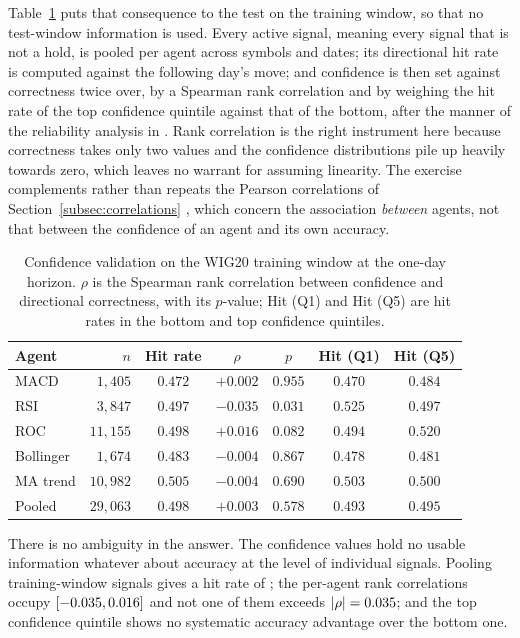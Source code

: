 Table~\ref{tab:confvalid} puts that consequence to the test on the training window, so that no test-window information is used. Every active signal, meaning every signal that is not a hold, is pooled per agent across symbols and dates; its directional hit rate is computed against the following day's move; and confidence is then set against correctness twice over, by a Spearman rank correlation \cite{spearman1904} and by weighing the hit rate of the top confidence quintile against that of the bottom, after the manner of the reliability analysis in \cite{murphywinkler1987}. Rank correlation is the right instrument here because correctness takes only two values and the confidence distributions pile up heavily towards zero, which leaves no warrant for assuming linearity. The exercise complements rather than repeats the Pearson correlations of Section~\ref{subsec:correlations} \cite{pearson1896}, which concern the association \emph{between} agents, not that between the confidence of an agent and its own accuracy.

\begin{table}[!htbp]
\centering
\setlength{\tabcolsep}{4pt}
\small
\caption{Confidence validation on the WIG20 training window at the one-day horizon. $\rho$ is the Spearman rank correlation between confidence and directional correctness, with its $p$-value; Hit (Q1) and Hit (Q5) are hit rates in the bottom and top confidence quintiles.}
\label{tab:confvalid}
\begin{tabular}{lrccccc}
\toprule
\textbf{Agent} & \textbf{$n$} & \textbf{Hit rate} & \textbf{$\rho$} & \textbf{$p$} & \textbf{Hit (Q1)} & \textbf{Hit (Q5)} \\
\midrule
MACD & $1{,}405$ & $0.472$ & $+0.002$ & $0.955$ & $0.470$ & $0.484$ \\
RSI & $3{,}847$ & $0.497$ & $-0.035$ & $0.031$ & $0.525$ & $0.497$ \\
ROC & $11{,}155$ & $0.498$ & $+0.016$ & $0.082$ & $0.494$ & $0.520$ \\
Bollinger & $1{,}674$ & $0.483$ & $-0.004$ & $0.867$ & $0.478$ & $0.481$ \\
MA trend & $10{,}982$ & $0.505$ & $-0.004$ & $0.690$ & $0.503$ & $0.500$ \\
Pooled & $29{,}063$ & $0.498$ & $+0.003$ & $0.578$ & $0.493$ & $0.495$ \\
\bottomrule
\end{tabular}
\end{table}

There is no ambiguity in the answer. The confidence values hold no usable information whatever about accuracy at the level of individual signals. Pooling \ConfN{} training-window signals gives a hit rate of \ConfPooledHit{}; the per-agent rank correlations occupy $[-0.035{}, 0.016{}]$ and not one of them exceeds $|\rho| = 0.035{}$; and the top confidence quintile shows no systematic accuracy advantage over the bottom one.

